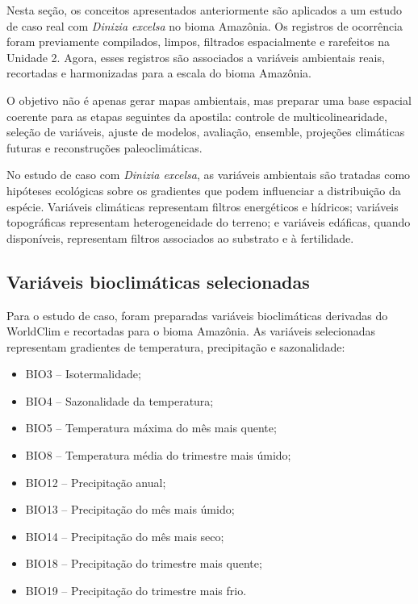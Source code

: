 Nesta seção, os conceitos apresentados anteriormente são aplicados a um estudo de caso real com \textit{Dinizia excelsa} no bioma Amazônia. Os registros de ocorrência foram previamente compilados, limpos, filtrados espacialmente e rarefeitos na Unidade 2. Agora, esses registros são associados a variáveis ambientais reais, recortadas e harmonizadas para a escala do bioma Amazônia.

O objetivo não é apenas gerar mapas ambientais, mas preparar uma base espacial coerente para as etapas seguintes da apostila: controle de multicolinearidade, seleção de variáveis, ajuste de modelos, avaliação, ensemble, projeções climáticas futuras e reconstruções paleoclimáticas.

\begin{aplicacao}
	No estudo de caso com \textit{Dinizia excelsa}, as variáveis ambientais são tratadas como hipóteses ecológicas sobre os gradientes que podem influenciar a distribuição da espécie. Variáveis climáticas representam filtros energéticos e hídricos; variáveis topográficas representam heterogeneidade do terreno; e variáveis edáficas, quando disponíveis, representam filtros associados ao substrato e à fertilidade.
\end{aplicacao}

\subsection{Variáveis bioclimáticas selecionadas}

Para o estudo de caso, foram preparadas variáveis bioclimáticas derivadas do WorldClim e recortadas para o bioma Amazônia. As variáveis selecionadas representam gradientes de temperatura, precipitação e sazonalidade:

\begin{itemize}
	\item BIO3 -- Isotermalidade;
	\item BIO4 -- Sazonalidade da temperatura;
	\item BIO5 -- Temperatura máxima do mês mais quente;
	\item BIO8 -- Temperatura média do trimestre mais úmido;
	\item BIO12 -- Precipitação anual;
	\item BIO13 -- Precipitação do mês mais úmido;
	\item BIO14 -- Precipitação do mês mais seco;
	\item BIO18 -- Precipitação do trimestre mais quente;
	\item BIO19 -- Precipitação do trimestre mais frio.
\end{itemize}

